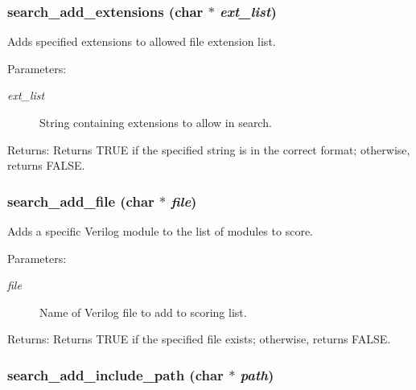 \subsubsection{ search\_\-add\_\-extensions (char $\ast$ {\em ext\_\-list})}\label{search_8h_a5}


Adds specified extensions to allowed file extension list. 

\begin{Desc}
\item[Parameters:]
\begin{description}
\item[{\em ext\_\-list}]String containing extensions to allow in search. \end{description}
\end{Desc}
\begin{Desc}
\item[Returns:]Returns TRUE if the specified string is in the correct format; otherwise, returns FALSE. \end{Desc}
\subsubsection{ search\_\-add\_\-file (char $\ast$ {\em file})}\label{search_8h_a3}


Adds a specific Verilog module to the list of modules to score. 

\begin{Desc}
\item[Parameters:]
\begin{description}
\item[{\em file}]Name of Verilog file to add to scoring list. \end{description}
\end{Desc}
\begin{Desc}
\item[Returns:]Returns TRUE if the specified file exists; otherwise, returns FALSE. \end{Desc}
\subsubsection{ search\_\-add\_\-include\_\-path (char $\ast$ {\em path})}\label{search_8h_a1}


